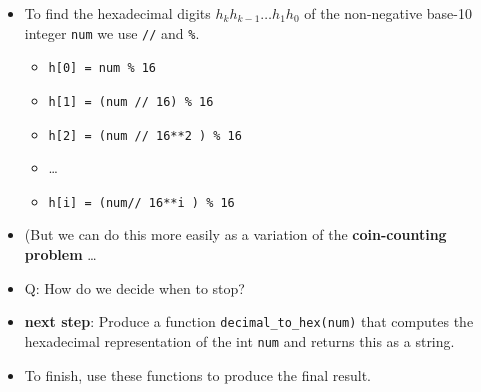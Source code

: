 \documentclass[]{tufte-handout}
\providecommand{\tightlist}{%
  \setlength{\itemsep}{0pt}\setlength{\parskip}{0pt}}
\begin{document}
\begin{itemize}
\tightlist
\item
  To find the hexadecimal digits \(h_k h_{k−1} \dots h_1 h_0\) of the
  non-negative base-10 integer \texttt{num} we use \texttt{//} and
  \texttt{\%}.

  \begin{itemize}
  \tightlist
  \item
    \texttt{h{[}0{]}\ =\ num\ \%\ 16}
  \item
    \texttt{h{[}1{]}\ =\ (num\ //\ 16)\ \%\ 16}
  \item
    \texttt{h{[}2{]}\ =\ (num\ //\ 16**2\ )\ \%\ 16}
  \item
    \ldots{}
  \item
    \texttt{h{[}i{]}\ =\ (num//\ 16**i\ )\ \%\ 16}
  \end{itemize}
\item
  (But we can do this more easily as a variation of the
  \textbf{coin-counting problem} \ldots{}
\item
  Q: How do we decide when to stop?
\item
  \textbf{next step}: Produce a function \texttt{decimal\_to\_hex(num)}
  that computes the hexadecimal representation of the int \texttt{num}
  and returns this as a string.
\item
  To finish, use these functions to produce the final result.
\end{itemize}
\end{document}
